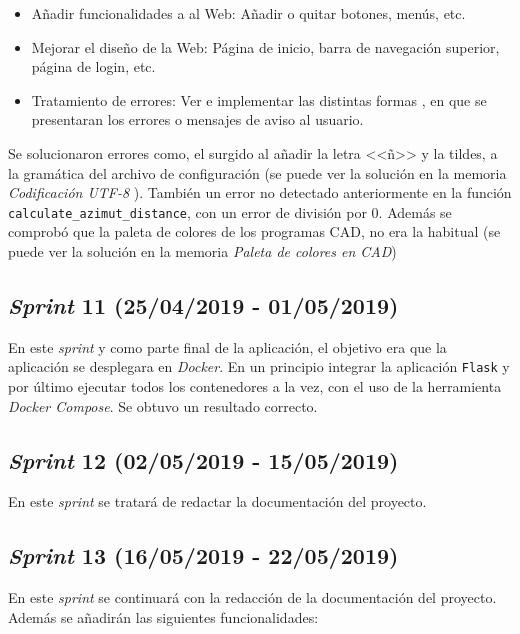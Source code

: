 \begin{itemize}
\item Añadir funcionalidades a al Web: Añadir o quitar botones, menús, etc.

\item  Mejorar el diseño de la Web: Página de inicio, barra de navegación superior, página de login, etc.

\item Tratamiento de errores: Ver e implementar las distintas formas , en que se presentaran los errores o mensajes de aviso al usuario.

\end{itemize}

Se solucionaron errores como, el surgido al añadir la letra <<ñ>> y la tildes, a la gramática del archivo de configuración (se puede ver la solución en la memoria \textit{ Codificación UTF-8 }). También un error no detectado anteriormente en la función  \texttt{calculate\_azimut\_distance}, con un error de división por 0.
Además se comprobó que la paleta de colores de los programas CAD, no era la habitual (se puede ver la solución en la memoria \textit{ Paleta de colores en CAD})

\subsection{\emph{Sprint} 11 (25/04/2019 - 01/05/2019)}

En este \emph{sprint} y como parte final de la aplicación, el objetivo era que la aplicación se desplegara en \emph{Docker}. En un principio integrar la aplicación \texttt{Flask} y por último ejecutar todos los contenedores a la vez, con el uso de la herramienta \emph{Docker Compose}. Se obtuvo un resultado correcto.

\subsection{\emph{Sprint} 12 (02/05/2019 - 15/05/2019)}

En este \emph{sprint} se tratará de redactar la documentación del proyecto.

\subsection{\emph{Sprint} 13 (16/05/2019 - 22/05/2019)}

En este \emph{sprint} se continuará con la redacción de la documentación del proyecto. Además se añadirán las siguientes funcionalidades:

